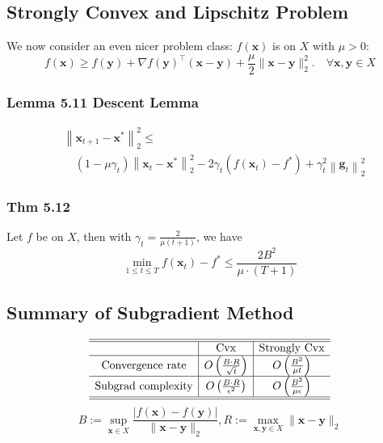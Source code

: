 \subsection*{Strongly Convex and Lipschitz Problem}
We now consider an even nicer problem class:
$f(\mathbf{x})$ is  on $X$ with $\mu>0$:
$$
f(\mathbf{x}) \geq f(\mathbf{y})+\nabla f(\mathbf{y})^{\top}(\mathbf{x}-\mathbf{y})+\frac{\mu}{2}\|\mathbf{x}-\mathbf{y}\|_{2}^{2} . \quad \forall \mathbf{x}, \mathbf{y} \in X
$$
\subsubsection*{Lemma 5.11 Descent Lemma}
$$
\begin{aligned}
    &\left\|\mathbf{x}_{t+1}-\mathbf{x}^{*}\right\|_{2}^{2} \leq \\
    & \quad \left(1-\mu \gamma_{t}\right)\left\|\mathbf{x}_{t}-\mathbf{x}^{*}\right\|_{2}^{2}-2 \gamma_{t}\left(f\left(\mathbf{x}_{t}\right)-f^{*}\right)+\gamma_{t}^{2}\left\|\mathbf{g}_{t}\right\|_{2}^{2}
\end{aligned}
$$
\subsubsection*{Thm 5.12}
Let $f$ be  on $X$, then with $\gamma_{t}=\frac{2}{\mu(t+1)}$, we have
$$
\min _{1 \leq t \leq T} f\left(\mathbf{x}_{t}\right)-f^{*} \leq \frac{2 B^{2}}{\mu \cdot(T+1)}
$$





\subsection*{Summary of Subgradient Method}
$$
\begin{array}{c|c|c}
\hline \hline & \text {Cvx} & \text {Strongly Cvx} \\
\hline \text {Convergence rate} & O\left(\frac{B \cdot R}{\sqrt{t}}\right) & O\left(\frac{B^{2}}{\mu t}\right) \\
\hline \text {Subgrad complexity} & O\left(\frac{B \cdot R}{\epsilon^{2}}\right) & O\left(\frac{B^{2}}{\mu \epsilon}\right) \\
\hline \hline
\end{array}
$$
$$
B:=\sup _{\mathbf{x} \in X} \frac{|f(\mathbf{x})-f(\mathbf{y})|}{\|\mathbf{x}-\mathbf{y}\|_{2}}, R:=\max _{\mathbf{x}, \mathbf{y} \in X}\|\mathbf{x}-\mathbf{y}\|_{2}
$$




